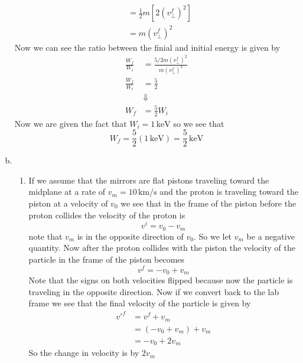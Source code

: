 \documentclass[11pt]{article}
\numberwithin{equation}{section}
\newcommand{\unit}[1]{\ensuremath{\, \mathrm{#1}}}
\begin{document}
\begin{enumerate}[(a)]
\begin{align*}
&= \frac{1}{2}m\left[2(v^f_{\perp})^2\right]\\
&= m(v^f_{\perp})^2
\end{align*}
Now we can see the ratio between the finial and initial energy is given by
\begin{align*}
\frac{W_f}{W_i} &= \frac{5/2m(v^f_{\perp})^2}{m(v^f_{\perp})^2}\\
\frac{W_f}{W_i} &= \frac{5}{2}\\
&\Downarrow\\
W_f &= \frac{5}{2}W_i
\end{align*}
Now we are given the fact that $W_i=1\unit{keV}$ so we see that
$$W_f = \frac{5}{2}(1\unit{keV}) = \frac{5}{2}\unit{keV}$$

\item
\begin{enumerate}[1)]
\item
If we assume that the mirrors are flat pistons traveling toward the midplane at a rate of $v_m = 10\unit{km/s}$ and the proton is traveling toward the piston at a velocity of $v_0$ we see that in the frame of the piston before the proton collides the velocity of the proton is 
$$v^i = v_0 - v_m$$
note that $v_m$ is in the opposite direction of $v_0$. So we let $v_m$ be a negative quantity. Now after the proton collides with the piston the velocity of the particle in the frame of the piston becomes
$$v^f = -v_0 + v_m$$
Note that the signs on both velocities flipped because now the particle is traveling in the opposite direction. Now if we convert back to the lab frame we see that the final velocity of the particle is given by
\begin{align*}
v'^f &= v^f +v_m\\
&= (-v_0+v_m) +v_m\\
&= -v_0+2v_m
\end{align*}
So the change in velocity is by $2v_m$


\end{enumerate}
\end{enumerate}
\end{document}
